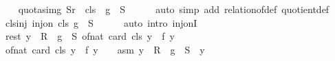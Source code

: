 \begin{isabellebody}
\ \ \isamarkupfalse%
\ quot{\isacharunderscore}{\kern0pt}as{\isacharunderscore}{\kern0pt}img{\isacharcolon}{\kern0pt}\ {\isachardoublequoteopen}S{\isacharslash}{\kern0pt}{\isacharslash}{\kern0pt}{\isacharquery}{\kern0pt}r\ {\isacharequal}{\kern0pt}\ {\isacharquery}{\kern0pt}cls\ {\isacharbackquote}{\kern0pt}\ g\ {\isacharbackquote}{\kern0pt}\ S{\isachardoublequoteclose}\isanewline
\ \ \ \ \isamarkupfalse%
\ {\isacharparenleft}{\kern0pt}auto\ simp\ add{\isacharcolon}{\kern0pt}\ relation{\isacharunderscore}{\kern0pt}of{\isacharunderscore}{\kern0pt}def\ quotient{\isacharunderscore}{\kern0pt}def{\isacharparenright}{\kern0pt}\isanewline
\ \ \isamarkupfalse%
\ cls{\isacharunderscore}{\kern0pt}inj{\isacharcolon}{\kern0pt}\ {\isachardoublequoteopen}inj{\isacharunderscore}{\kern0pt}on\ {\isacharquery}{\kern0pt}cls\ {\isacharparenleft}{\kern0pt}g\ {\isacharbackquote}{\kern0pt}\ S{\isacharparenright}{\kern0pt}{\isachardoublequoteclose}\isanewline
\ \ \ \ \isamarkupfalse%
\ {\isacharparenleft}{\kern0pt}auto\ intro{\isacharcolon}{\kern0pt}\ inj{\isacharunderscore}{\kern0pt}onI{\isacharparenright}{\kern0pt}\isanewline
\isanewline
\ \ \isamarkupfalse%
\ rest{\isacharunderscore}{\kern0pt}{}{\isacharcolon}{\kern0pt}\ {\isachardoublequoteopen}{\isacharparenleft}{\kern0pt}{\isasymSum}y\ {\isasymin}\ R\ {\isacharminus}{\kern0pt}\ g\ {\isacharbackquote}{\kern0pt}\ S{\isachardot}{\kern0pt}\ of{\isacharunderscore}{\kern0pt}nat\ {\isacharparenleft}{\kern0pt}card\ {\isacharparenleft}{\kern0pt}{\isacharquery}{\kern0pt}cls\ y{\isacharparenright}{\kern0pt}{\isacharparenright}{\kern0pt}\ {\isacharasterisk}{\kern0pt}\ f\ y{\isacharparenright}{\kern0pt}\ {\isacharequal}{\kern0pt}\ {}{\isachardoublequoteclose}\isanewline
\ \ \isamarkupfalse%
\ {\isacharminus}{\kern0pt}\isanewline
\ \ \ \ \isamarkupfalse%
\ {\isachardoublequoteopen}of{\isacharunderscore}{\kern0pt}nat\ {\isacharparenleft}{\kern0pt}card\ {\isacharparenleft}{\kern0pt}{\isacharquery}{\kern0pt}cls\ y{\isacharparenright}{\kern0pt}{\isacharparenright}{\kern0pt}\ {\isacharasterisk}{\kern0pt}\ f\ y\ {\isacharequal}{\kern0pt}\ {}{\isachardoublequoteclose}\ \ asm{\isacharcolon}{\kern0pt}\ {\isachardoublequoteopen}y\ {\isasymin}\ R\ {\isacharminus}{\kern0pt}\ g\ {\isacharbackquote}{\kern0pt}\ S{\isachardoublequoteclose}\ \ y\isanewline
\ \ \ \ \isamarkupfalse%
\ {\isacharminus}{\kern0pt}\isanewline
\ \ \ \ \ \ \isamarkupfalse%

\end{isabellebody}
